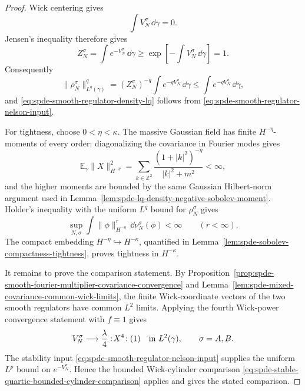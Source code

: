 \begin{proof}
Wick centering gives
\[
  \int V_N^\sigma\,\dd\gamma=0 .
\]
Jensen's inequality therefore gives
\[
  Z_N^\sigma=\int e^{-V_N^\sigma}\,\dd\gamma
  \geq
  \exp\!\left[-\int V_N^\sigma\,\dd\gamma\right]
  =1 .
\]
Consequently
\[
  \|\rho_N^\sigma\|_{L^q(\gamma)}^q
  =
  (Z_N^\sigma)^{-q}
  \int e^{-qV_N^\sigma}\,\dd\gamma
  \leq
  \int e^{-qV_N^\sigma}\,\dd\gamma,
\]
and \eqref{eq:spde-smooth-regulator-density-lq} follows from
\eqref{eq:spde-smooth-regulator-nelson-input}.

For tightness, choose \(0<\eta<\kappa\).  The massive Gaussian field has
finite \(H^{-\eta}\)-moments of every order: diagonalizing the covariance
in Fourier modes gives
\[
  \mathbb E_\gamma\|X\|_{H^{-\eta}}^2
  =
  \sum_{k\in\mathbb Z^2}
  \frac{(1+|k|^2)^{-\eta}}{|k|^2+m^2}
  <\infty,
\]
and the higher moments are bounded by the same Gaussian Hilbert-norm
argument used in
Lemma~\ref{lem:spde-lq-density-negative-sobolev-moment}.  Holder's
inequality with the uniform \(L^q\) bound for \(\rho_N^\sigma\) gives
\[
  \sup_{N,\sigma}
  \int\|\phi\|_{H^{-\eta}}^r\,\dd\nu_N^\sigma(\phi)<\infty
  \qquad (r<\infty).
\]
The compact embedding \(H^{-\eta}\hookrightarrow H^{-\kappa}\), quantified
in Lemma~\ref{lem:spde-sobolev-compactness-tightness}, proves
tightness in \(H^{-\kappa}\).

It remains to prove the comparison statement.  By
Proposition~\ref{prop:spde-smooth-fourier-multiplier-covariance-convergence}
and
Lemma~\ref{lem:spde-mixed-covariance-common-wick-limits}, the finite
Wick-coordinate vectors of the two smooth regulators have common \(L^2\)
limits.  Applying the fourth Wick-power convergence statement with
\(f\equiv1\) gives
\[
  V_N^\sigma\longrightarrow
  \frac{\lambda}{4}:\!X^4\!:(1)
  \quad\hbox{in }L^2(\gamma),
  \qquad \sigma=A,B .
\]
The stability input \eqref{eq:spde-smooth-regulator-nelson-input} supplies
the uniform \(L^p\) bound on \(e^{-V_N^\sigma}\).  Hence the bounded
Wick-cylinder comparison
\eqref{eq:spde-stable-quartic-bounded-cylinder-comparison} applies and gives
the stated comparison.
\end{proof}


